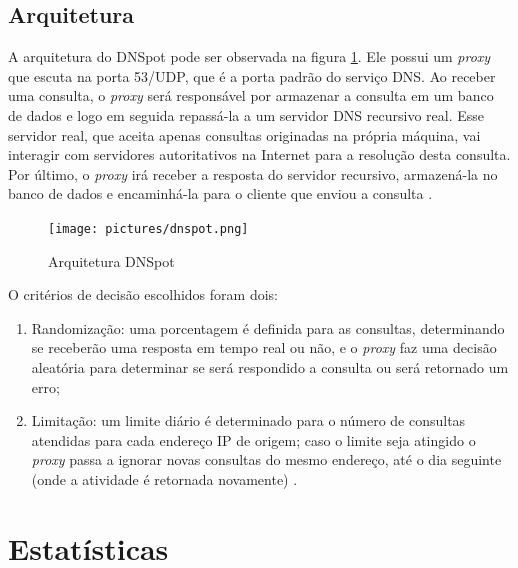\subsection{Arquitetura}
A arquitetura do DNSpot pode ser observada na figura \ref{fig:dnspot}. Ele possui um \textit{proxy} que escuta na porta 53/UDP, que é a porta padrão do serviço DNS\@. Ao receber uma consulta, o \textit{proxy} será responsável por armazenar a consulta em um banco de dados e logo em seguida repassá-la a um servidor DNS recursivo real. Esse servidor real, que aceita apenas consultas originadas na própria máquina, vai interagir com servidores autoritativos na Internet para a resolução desta consulta. Por último, o \textit{proxy} irá receber a resposta do servidor recursivo, armazená-la no banco de dados e encaminhá-la para o cliente que enviou a consulta \cite{Longo:2015:tcc}.


    \begin{figure}[ht]
        \centering
        \texttt{[image: pictures/dnspot.png]}
        \caption{Arquitetura DNSpot}        
        \label{fig:dnspot}

    \end{figure}
    \FloatBarrier



O critérios de decisão escolhidos foram dois:

\begin{enumerate}

	\item Randomização: uma porcentagem é definida para as consultas, determinando se receberão uma resposta em tempo real ou não, e o \textit{proxy} faz uma decisão aleatória para determinar se será respondido a consulta ou será retornado um erro;

	\item Limitação: um limite diário é determinado para o número de consultas atendidas para cada endereço IP de origem; caso o limite seja atingido o \textit{proxy} passa a ignorar novas consultas do mesmo endereço,  até o dia seguinte (onde a atividade é retornada novamente) \cite{Longo:2015:tcc}.
	
\end{enumerate}

\section{Estatísticas}
\label{sec:introEsta}


